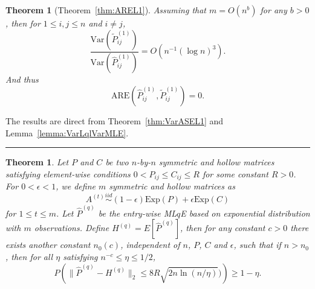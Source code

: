 \documentclass[a4paper]{article}
\newenvironment{proof}{{\bf Proof:  }}{\hfill\rule{2mm}{2mm}}
\newtheorem{theorem}[fact]{Theorem}
\renewcommand{\hat}{\widehat}
\begin{document}
\begin{theorem}[Theorem~\ref{thm:AREL1}]
\label{thm:AREL1proof}
Assuming that $m = O(n^b)$ for any $b > 0$,  then for $1 \le i, j \le n$ and $i \ne j$,
\[
	\frac{\mathrm{Var}(\widetilde{P}_{ij}^{(1)})}{\mathrm{Var}(\hat{P}_{ij}^{(1)})}
    = O(n^{-1} (\log n)^3).
\]
And thus
\[
	\mathrm{ARE}(\hat{P}_{ij}^{(1)}, \widetilde{P}_{ij}^{(1)}) = 0.
\]
\end{theorem}
\begin{proof}
The results are direct from Theorem~\ref{thm:VarASEL1} and Lemma~\ref{lemma:VarLqlVarMLE}.
\end{proof}



\begin{theorem}
\label{thm:PqDiff}
Let $P$ and $C$ be two $n$-by-$n$ symmetric and hollow matrices satisfying element-wise conditions $0 < P_{ij} \le C_{ij} \le R$ for some constant $R > 0$. For $0 < \epsilon < 1$, we define $m$ symmetric and hollow matrices as
\[
	A^{(t)} \stackrel{iid}{\sim} (1-\epsilon) \mathrm{Exp}(P) + \epsilon \mathrm{Exp}(C)
\]
for $1 \le t \le m$.
Let $\hat{P}^{(q)}$ be the entry-wise ML$q$E based on exponential distribution with $m$ observations.
Define $H^{(q)} = E[\hat{P}^{(q)}]$,
then for any constant $c > 0$ there exists another constant $n_0(c)$, independent of $n$, $P$, $C$ and $\epsilon$, such that if $n > n_0$, then for all $\eta$ satisfying $n^{-c} \le \eta \le 1/2$,
\[
	P \left( \| \hat{P}^{(q)} - H^{(q)} \|_2 \le 8 R \sqrt{2 n \ln(n/\eta)}) \right) \ge 1 - \eta.
\]
\end{theorem}
\end{document}

